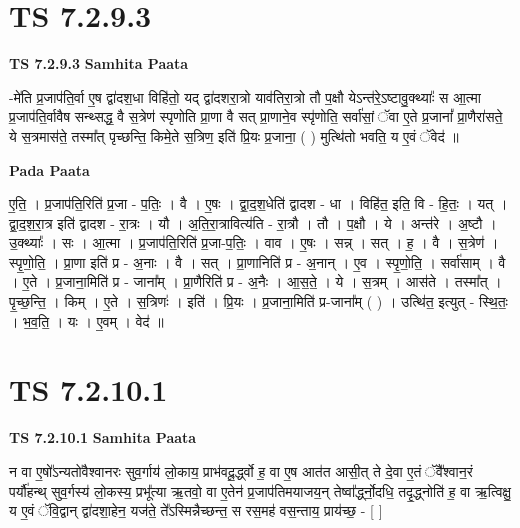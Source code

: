 \documentclass[17pt]{extarticle}
\begin{document}

\section{ TS 7.2.9.3 }

\textbf{TS 7.2.9.3 } \newline
\textbf{Samhita Paata} \newline

-मे॑ति प्र॒जाप॑ति॒र्वा ए॒ष द्वा॑दश॒धा विहि॑तो॒ यद् द्वा॑दशरा॒त्रो याव॑तिरा॒त्रो तौ प॒क्षौ येऽन्त॑रे॒ऽष्टावु॒क्थ्याः᳚ स आ॒त्मा प्र॒जाप॑ति॒र्वावैष सन्थ्सद्ध॒ वै स॒त्रेण॑ स्पृणोति प्रा॒णा वै सत् प्रा॒णाने॒व स्पृ॑णोति॒ सर्वा॑सां॒ ॅवा ए॒ते प्र॒जानां᳚ प्रा॒णैरा॑सते॒ ये स॒त्रमास॑ते॒ तस्मा᳚त् पृच्छन्ति॒ किमे॒ते स॒त्रिण॒ इति॑ प्रि॒यः प्र॒जाना॒ ( ) मुत्थि॑तो भवति॒ य ए॒वं ॅवेद॑ ॥ \newline

\textbf{Pada Paata} \newline

ए॒ति॒ । प्र॒जाप॑ति॒रिति॑ प्र॒जा - प॒तिः॒ । वै । ए॒षः । द्वा॒द॒श॒धेति॑ द्वादश - धा । विहि॑त॒ इति॒ वि - हि॒तः॒ । यत् । द्वा॒द॒श॒रा॒त्र इति॑ द्वादश - रा॒त्रः । यौ । अ॒ति॒रा॒त्रावित्य॑ति - रा॒त्रौ । तौ । प॒क्षौ । ये । अन्त॑रे । अ॒ष्टौ । उ॒क्थ्याः᳚ । सः । आ॒त्मा । प्र॒जाप॑ति॒रिति॑ प्र॒जा-प॒तिः॒ । वाव । ए॒षः । सन्न् । सत् । ह॒ । वै । स॒त्रेण॑ । स्पृ॒णो॒ति॒ । प्रा॒णा इति॑ प्र - अ॒नाः । वै । सत् । प्रा॒णानिति॑ प्र - अ॒नान् । ए॒व । स्पृ॒णो॒ति॒ । सर्वा॑साम् । वै । ए॒ते । प्र॒जाना॒मिति॑ प्र - जाना᳚म् । प्रा॒णैरिति॑ प्र - अ॒नैः । आ॒स॒ते॒ । ये । स॒त्रम् । आस॑ते । तस्मा᳚त् । पृ॒च्छ॒न्ति॒ । किम् । ए॒ते । स॒त्रिणः॑ । इति॑ । प्रि॒यः । प्र॒जाना॒मिति॑ प्र-जाना᳚म् ( ) । उत्थि॑त॒ इत्युत् - स्थि॒तः॒ । भ॒व॒ति॒ । यः । ए॒वम् । वेद॑ ॥  \newline





\section{ TS 7.2.10.1 }

\textbf{TS 7.2.10.1 } \newline
\textbf{Samhita Paata} \newline

न वा ए॒षो᳚ऽन्यतो॑वैश्वानरः सुव॒र्गाय॑ लो॒काय॒ प्राभ॑वदू॒र्द्ध्वो ह॒ वा ए॒ष आत॑त आसी॒त् ते दे॒वा ए॒तं ॅवै᳚श्वान॒रं पर्यौ॑हन्थ् सुव॒र्गस्य॑ लो॒कस्य॒ प्रभू᳚त्या ऋ॒तवो॒ वा ए॒तेन॑ प्र॒जाप॑तिमयाजय॒न् तेष्वा᳚र्द्ध्नो॒दधि॒ तदृ॒द्ध्नोति॑ ह॒ वा ऋ॒त्विक्षु॒ य ए॒वं ॅवि॒द्वान् द्वा॑दशा॒हेन॒ यज॑ते॒ ते᳚ऽस्मिन्नैच्छन्त॒ स रस॒मह॑ वस॒न्ताय॒ प्राय॑च्छ॒ - [  ] \newline
\end{document}
